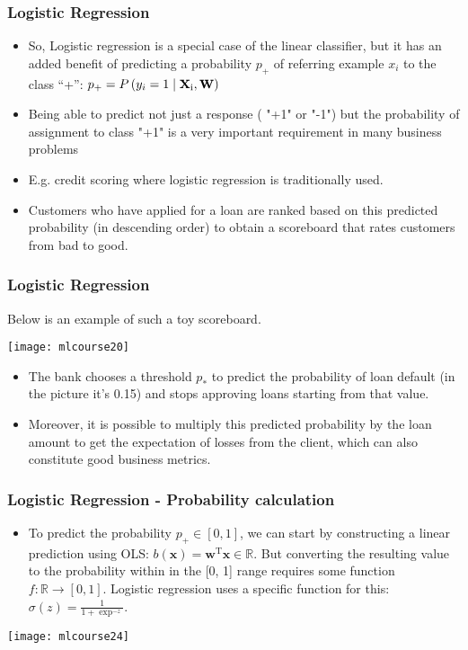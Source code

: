 \begin{frame}[fragile]\frametitle{Logistic Regression}
 \begin{itemize}
 \item So, Logistic regression is a special case of the linear classifier, but it has an added benefit of predicting a probability $p_+$ of referring example $x_i$ to the class ``+'': $\Large p_+ = P\left(y_i = 1 \mid \textbf{x}_\text{i}, \textbf{w}\right)$
 \item Being able to predict not just a response ( "+1" or "-1") but the probability of assignment to class "+1" is a very important requirement in many business problems 
 \item E.g. credit scoring where logistic regression is traditionally used. 
 \item Customers who have applied for a loan are ranked based on this predicted probability (in descending order) to obtain a scoreboard that rates customers from bad to good.
\end{itemize}

\end{frame}


\begin{frame}[fragile]\frametitle{Logistic Regression}
Below is an example of such a toy scoreboard.
\begin{center}
\texttt{[image: mlcourse20]}
\end{center}
 \begin{itemize}
 \item The bank chooses a threshold $p_*$ to predict the probability of loan default (in the picture it's 0.15) and stops approving loans starting from that value. 
 \item Moreover, it is possible to multiply this predicted probability by the loan amount to get the expectation of losses from the client, which can also constitute good business metrics.
 \end{itemize}

\end{frame}

\begin{frame}[fragile]\frametitle{Logistic Regression - Probability calculation}
\begin{itemize}
\item To predict the probability $p_+ \in [0,1]$, we can start by constructing a linear prediction using OLS: $b(\textbf{x}) = \textbf{w}^\text{T} \textbf{x} \in \mathbb{R}$. But converting the resulting value to the probability within in the [0, 1] range requires some function $f: \mathbb{R} \rightarrow [0,1]$. Logistic regression uses a specific function for this: $\sigma(z) = \frac{1}{1 + \exp^{-z}}$. 
\end{itemize}

\begin{center}
\texttt{[image: mlcourse24]}
\end{center}

\end{frame}


